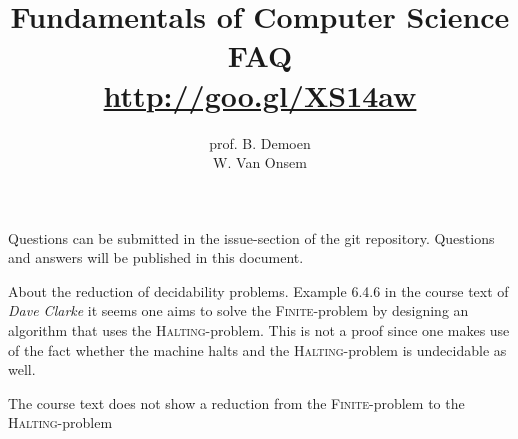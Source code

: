\documentclass{article}
\title{Fundamentals of Computer Science\\FAQ\\\url{http://goo.gl/XS14aw}}
\author{prof. B. Demoen\\W. Van Onsem}
\date{}
\begin{document}
\maketitle
Questions can be submitted in the issue-section of the git repository. Questions and answers will be published in this document.

\begin{question}
About the reduction of decidability problems. Example 6.4.6 in the course text of \emph{Dave Clarke} it seems
one aims to solve the \textsc{Finite}-problem by designing an algorithm that uses the \textsc{Halting}-problem.
This is not a proof since one makes use of the fact whether the machine halts and the \textsc{Halting}-problem
is undecidable as well.
\begin{answer}
The course text does not show a reduction from the \textsc{Finite}-problem to the \textsc{Halting}-problem
\end{answer}
\end{question}
\end{document}
